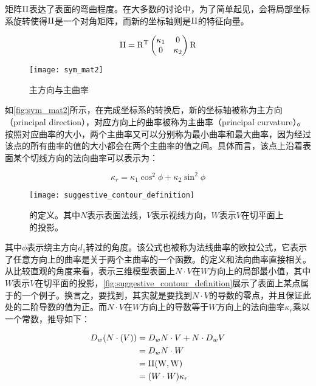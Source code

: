 矩阵$\rm II$表达了表面的弯曲程度。在大多数的讨论中，为了简单起见，会将局部坐标系旋转使得$\rm II$是一个对角矩阵，而新的坐标轴则是$\rm II$的特征向量。

\begin{equation}
    \rm II = R^T
    \begin{pmatrix}
        \kappa_1 & 0 \\
        0 & \kappa_2
    \end{pmatrix}
    R
\end{equation}

\begin{figure}[tbh]
    \centering
    \texttt{[image: sym\_mat2]}
    \caption{\label{fig:sym_mat2}
    主方向与主曲率}
\end{figure}

如\autoref{fig:sym_mat2}\cite{rusinkiewicz2008line}所示，在完成坐标系的转换后，新的坐标轴被称为主方向（principal direction），对应方向上的曲率被称为主曲率（principal curvature）。按照对应曲率的大小，两个主曲率又可以分别称为最小曲率和最大曲率，因为经过该点的所有曲率的值的大小都会在两个主曲率的值之间。具体而言，该点上沿着表面某个切线方向的法向曲率可以表示为：

\begin{equation}
    \kappa_r = \kappa_1\cos^2\phi + \kappa_2\sin^2\phi
\end{equation}

\begin{figure}[tbp]
    \centering
    \texttt{[image: suggestive\_contour\_definition]}
    \caption{\label{fig:suggestive_contour_definition}
    \scon{}的定义。其中$N$表示表面法线，$V$表示视线方向，$W$表示$V$在切平面上的投影。}
\end{figure}

其中$\phi$表示绕主方向$d_1$转过的角度。该公式也被称为法线曲率的欧拉公式，它表示了任意方向上的曲率是关于两个主曲率的一个函数。\scon{}的定义和法向曲率直接相关。从比较直观的角度来看，\scon{}表示三维模型表面上$N\cdot{V}$在$W$方向上的局部最小值，其中$W$表示$V$在切平面的投影，\autoref{fig:suggestive_contour_definition}展示了表面上某点属于\scon{}的一个例子。换言之，要找到\scon{}，其实就是要找到$N\cdot{V}$的导数的零点，并且保证此处的二阶导数的值为正。而$N\cdot{V}$在$W$方向上的导数等于$W$方向上的法向曲率$\kappa_r$乘以一个常数，推导如下：

\begin{align}
    D_w(N\cdot(V)) &= D_w{N}\cdot{V} + N\cdot{D_w{V}} \\
                   &= D_w{N}\cdot{W} \\
                   &= \rm II(W, W) \\
                   &= (W\cdot{W})\kappa_r
\end{align}
  
